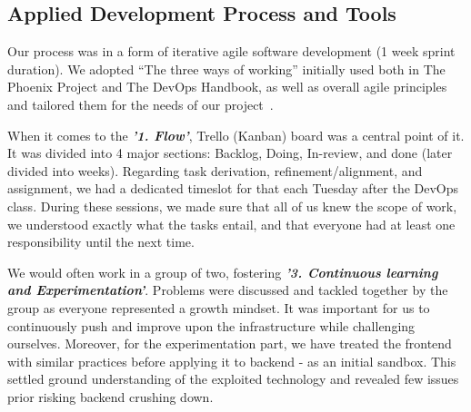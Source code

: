 \subsection{Applied Development Process and Tools}


Our process was in a form of iterative agile software development (1 week sprint duration). We adopted “The three ways of working” initially used both in The Phoenix Project and The DevOps Handbook, as well as overall agile principles and tailored them for the needs of our project~\cite{devOpsHandbook}.

When it comes to the \textbf{\textit{'1. Flow'}}, Trello (Kanban) board was a central point of it. It was divided into 4 major sections: Backlog, Doing, In-review, and done (later divided into weeks). Regarding task derivation, refinement/alignment, and assignment, we had a dedicated timeslot for that each Tuesday after the DevOps class. During these sessions, we made sure that all of us knew the scope of work, we understood exactly what the tasks entail, and that everyone had at least one responsibility until the next time. 

We would often work in a group of two, fostering \textbf{\textit{'3. Continuous learning and Experimentation'}}. Problems were discussed and tackled together by the group as everyone represented a growth mindset. It was important for us to continuously push and improve upon the infrastructure while challenging ourselves. Moreover, for the experimentation part, we have treated the frontend with similar practices before applying it to backend - as an initial sandbox. This settled ground understanding of the exploited technology and revealed few issues prior risking backend crushing down.

